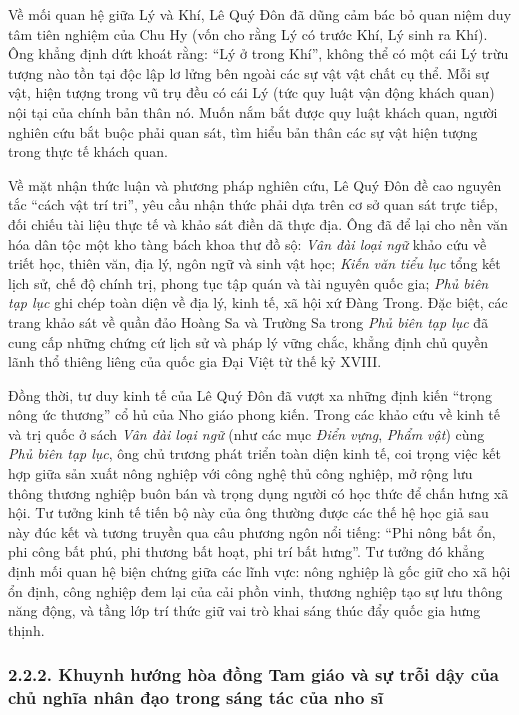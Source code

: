 Về mối quan hệ giữa Lý và Khí, Lê Quý Đôn đã dũng cảm bác bỏ quan niệm duy tâm tiên nghiệm của Chu Hy (vốn cho rằng Lý có trước Khí, Lý sinh ra Khí). Ông khẳng định dứt khoát rằng: ``Lý ở trong Khí'', không thể có một cái Lý trừu tượng nào tồn tại độc lập lơ lửng bên ngoài các sự vật vật chất cụ thể. Mỗi sự vật, hiện tượng trong vũ trụ đều có cái Lý (tức quy luật vận động khách quan) nội tại của chính bản thân nó. Muốn nắm bắt được quy luật khách quan, người nghiên cứu bắt buộc phải quan sát, tìm hiểu bản thân các sự vật hiện tượng trong thực tế khách quan.

Về mặt nhận thức luận và phương pháp nghiên cứu, Lê Quý Đôn đề cao nguyên tắc ``cách vật trí tri'', yêu cầu nhận thức phải dựa trên cơ sở quan sát trực tiếp, đối chiếu tài liệu thực tế và khảo sát điền dã thực địa. Ông đã để lại cho nền văn hóa dân tộc một kho tàng bách khoa thư đồ sộ: \textit{Vân đài loại ngữ} khảo cứu về triết học, thiên văn, địa lý, ngôn ngữ và sinh vật học; \textit{Kiến văn tiểu lục} tổng kết lịch sử, chế độ chính trị, phong tục tập quán và tài nguyên quốc gia; \textit{Phủ biên tạp lục} ghi chép toàn diện về địa lý, kinh tế, xã hội xứ Đàng Trong. Đặc biệt, các trang khảo sát về quần đảo Hoàng Sa và Trường Sa trong \textit{Phủ biên tạp lục} đã cung cấp những chứng cứ lịch sử và pháp lý vững chắc, khẳng định chủ quyền lãnh thổ thiêng liêng của quốc gia Đại Việt từ thế kỷ XVIII.

Đồng thời, tư duy kinh tế của Lê Quý Đôn đã vượt xa những định kiến ``trọng nông ức thương'' cổ hủ của Nho giáo phong kiến. Trong các khảo cứu về kinh tế và trị quốc ở sách \textit{Vân đài loại ngữ} (như các mục \textit{Điển vựng}, \textit{Phẩm vật}) cùng \textit{Phủ biên tạp lục}, ông chủ trương phát triển toàn diện kinh tế, coi trọng việc kết hợp giữa sản xuất nông nghiệp với công nghệ thủ công nghiệp, mở rộng lưu thông thương nghiệp buôn bán và trọng dụng người có học thức để chấn hưng xã hội. Tư tưởng kinh tế tiến bộ này của ông thường được các thế hệ học giả sau này đúc kết và tương truyền qua câu phương ngôn nổi tiếng: ``Phi nông bất ổn, phi công bất phú, phi thương bất hoạt, phi trí bất hưng''. Tư tưởng đó khẳng định mối quan hệ biện chứng giữa các lĩnh vực: nông nghiệp là gốc giữ cho xã hội ổn định, công nghiệp đem lại của cải phồn vinh, thương nghiệp tạo sự lưu thông năng động, và tầng lớp trí thức giữ vai trò khai sáng thúc đẩy quốc gia hưng thịnh.

\subsubsection*{2.2.2. Khuynh hướng hòa đồng Tam giáo và sự trỗi dậy của chủ nghĩa nhân đạo trong sáng tác của nho sĩ}

